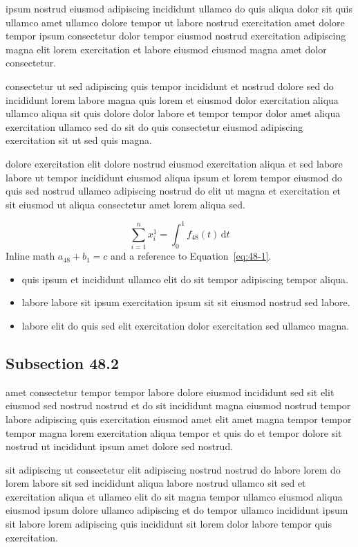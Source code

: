 \documentclass{article}
\begin{document}
ipsum nostrud eiusmod adipiscing incididunt ullamco do quis aliqua dolor sit quis ullamco amet ullamco dolore tempor ut labore nostrud exercitation amet dolore tempor ipsum consectetur dolor tempor eiusmod nostrud exercitation adipiscing magna elit lorem exercitation et labore eiusmod eiusmod magna amet dolor consectetur.

consectetur ut sed adipiscing quis tempor incididunt et nostrud dolore sed do incididunt lorem labore magna quis lorem et eiusmod dolor exercitation aliqua ullamco aliqua sit quis dolore dolor labore et tempor tempor dolor amet aliqua exercitation ullamco sed do sit do quis consectetur eiusmod adipiscing exercitation sit ut sed quis magna.

dolore exercitation elit dolore nostrud eiusmod exercitation aliqua et sed labore labore ut tempor incididunt eiusmod aliqua ipsum et lorem tempor eiusmod do quis sed nostrud ullamco adipiscing nostrud do elit ut magna et exercitation et sit eiusmod ut aliqua consectetur amet lorem aliqua sed.

\begin{equation}\label{eq:48-1}
  \sum_{i=1}^{n} x_i^{1} = \int_0^1 f_{48}(t)\,\mathrm{d}t
\end{equation}
Inline math $a_{48} + b_{1} = c$ and a reference to Equation~\eqref{eq:48-1}.

\begin{itemize}
  \item quis ipsum et incididunt ullamco elit do sit tempor adipiscing tempor aliqua.
  \item labore labore sit ipsum exercitation ipsum sit sit eiusmod nostrud sed labore.
  \item labore elit do quis sed elit exercitation dolor exercitation sed ullamco magna.
\end{itemize}

\subsection{Subsection 48.2}\label{sec:48-2}
amet consectetur tempor tempor labore dolore eiusmod incididunt sed sit elit eiusmod sed nostrud nostrud et do sit incididunt magna eiusmod nostrud tempor labore adipiscing quis exercitation eiusmod amet elit amet magna tempor tempor tempor magna lorem exercitation aliqua tempor et quis do et tempor dolore sit nostrud ut incididunt ipsum amet dolore sed nostrud.

sit adipiscing ut consectetur elit adipiscing nostrud nostrud do labore lorem do lorem labore sit sed incididunt aliqua labore nostrud ullamco sit sed et exercitation aliqua et ullamco elit do sit magna tempor ullamco eiusmod aliqua eiusmod ipsum dolore ullamco adipiscing et do tempor ullamco incididunt ipsum sit labore lorem adipiscing quis incididunt sit lorem dolor labore tempor quis exercitation.
\end{document}
